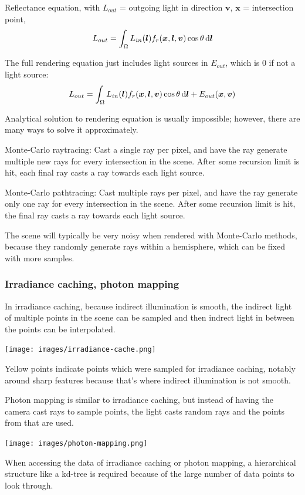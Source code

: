 \documentclass[12pt]{article}
\begin{document}
Reflectance equation, with $L_{out}$ = outgoing light in direction
$\bm v$, $\bm x$ = intersection point,
\[ L_{out} = \int_{\Omega} L_{in}(\bm l) f_r(\bm x,\bm l,\bm v)
\cos\theta \mathop{}\!\mathrm{d} \bm l \]

The full rendering equation just includes light sources in $E_{out}$,
which is 0 if not a light source:
\[ L_{out} = \int_{\Omega} L_{in}(\bm l) f_r(\bm x,\bm l,\bm v)
\cos\theta \mathop{}\!\mathrm{d} \bm l + E_{out}(\bm x,\bm v) \]

Analytical solution to rendering equation is usually impossible;
however, there are many ways to solve it approximately.

Monte-Carlo raytracing: Cast a single ray per pixel, and have the ray generate
multiple new rays for every intersection in the scene. After some recursion
limit is hit, each final ray casts a ray towards each light source.

Monte-Carlo pathtracing: Cast multiple rays per pixel, and have the ray
generate only one ray for every intersection in the scene. After some
recursion limit is hit, the final ray casts a ray towards each light source.

The scene will typically be very noisy when rendered with Monte-Carlo methods,
because they randomly generate rays within a hemisphere, which can be
fixed with more samples.

\subsubsection{Irradiance caching, photon mapping}

In irradiance caching, because indirect illumination is smooth, the indirect light of multiple points
in the scene can be sampled and then indrect light in between the points can be
interpolated.

\texttt{[image: images/irradiance-cache.png]}

Yellow points indicate points which were sampled for irradiance caching,
notably around sharp features because that's where indirect illumination
is not smooth.

Photon mapping is similar to irradiance caching, but instead of having
the camera cast rays to sample points, the light casts random rays
and the points from that are used.

\texttt{[image: images/photon-mapping.png]}

When accessing the data of irradiance caching or photon mapping, a hierarchical
structure like a kd-tree is required because of the large number of data
points to look through.
\end{document}
